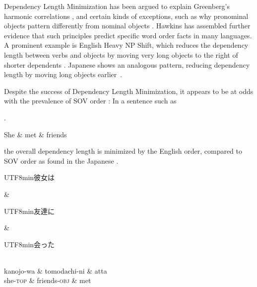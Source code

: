 \documentclass[11pt,a4paper]{article}
\newcommand{\japanese}[1]{\begin{CJK}{UTF8}{min}#1\end{CJK}}
\begin{document}
Dependency Length Minimization has been argued to explain Greenberg's harmonic correlations \citep{rijkhoff-word-1986, hawkins1994performance}, and certain kinds of exceptions, such as why pronominal objects pattern differently from nominal objects \citep{dryer1992greenbergian}. %
Hawkins \citep{hawkins2004efficiency, hawkins2007processing, hawkins2014crosslinguistic} has assembled further evidence that such principles predict specific word order facts in many languages. 
A prominent example is English Heavy NP Shift, which reduces the dependency length between verbs and objects by moving very long objects to the right of shorter dependents \citep{hawkins1994performance, wasow1997end}.
Japanese shows an analogous pattern, reducing dependency length by moving long objects earlier~\citep{yamashita2001long}.

Despite the success of Dependency Length Minimization, it appears to be at odds with the prevalence of SOV order \citep{ferrer-i-cancho-placement-2017}: In a sentence such as

\ex.
\begin{dependency}[theme = simple]
   \begin{deptext}[column sep=1em]
          She \& met \& friends  \\
   \end{deptext}
\end{dependency}

the overall dependency length is minimized by the English order, compared to SOV order as found in the Japanese
\ex.
\begin{dependency}[theme = simple]
   \begin{deptext}[column sep=1em]
          \japanese{彼女は} \& \japanese{友達に} \& \japanese{会った}  \\
          kanojo-wa \& tomodachi-ni \& atta \\ 
          she-\textsc{top} \& friends-\textsc{obj} \& met \\
   \end{deptext}
\end{dependency}

\end{document}
